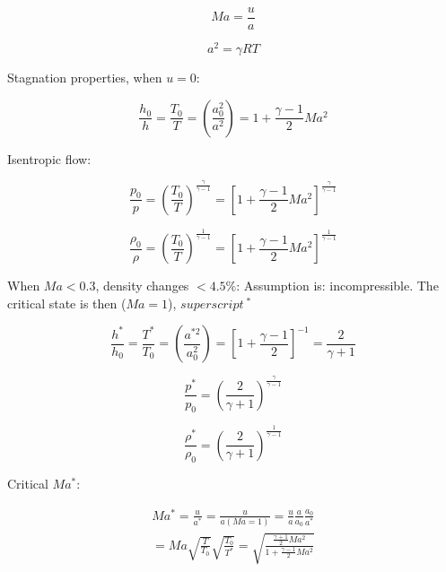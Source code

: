 \documentclass[8pt, landscape, fleqn]{scrartcl}
\begin{document}
\begin{multicols*}{3}
\begin{equation}
    Ma = \frac{u}{a}
\end{equation}

\begin{equation}
    a^2 = \gamma R T 
\end{equation}

Stagnation properties, when $u=0$: 

\begin{equation}
    \frac{h_0}{h} = \frac{T_0}{T} = \left( \frac{a_0^2}{a^2}\right) = 1 + \frac{\gamma - 1}{2} Ma^2
\end{equation}

Isentropic flow:

\begin{equation}
    \frac{p_0}{p} = \left( \frac{T_0}{T}\right)^{\frac{\gamma}{\gamma -1}} = \left[ 1 + \frac{\gamma-1}{2} Ma^2 \right]^{\frac{\gamma}{\gamma-1}}
\end{equation}

\begin{equation}
    \frac{\rho_0}{\rho} = \left( \frac{T_0}{T} \right)^{\frac{1}{\gamma-1}} = \left[ 1 + \frac{\gamma-1}{2} Ma^2 \right]^{\frac{1}{\gamma-1}}
\end{equation}

When $Ma < 0.3$, density changes $< 4.5 \%$: Assumption is: incompressible. The critical state is then ($Ma = 1$), $superscript~^*$

\begin{equation}
    \frac{h^*}{h_0} = \frac{T^*}{T_0} = \left( \frac{a^{*2}}{a_0^2}\right) = \left[ 1 + \frac{\gamma -1 }{2}\right]^{-1} = \frac{2}{\gamma+1}
\end{equation}

\begin{equation}
    \frac{p^*}{p_0} = \left( \frac{2}{\gamma+1} \right)^{\frac{\gamma}{\gamma-1}}
\end{equation}

\begin{equation}
    \frac{\rho^*}{\rho_0} = \left( \frac{2}{\gamma+1} \right)^{\frac{1}{\gamma-1}}
\end{equation}

Critical $Ma^*$:

\begin{align}
    Ma^* = \frac{u}{a^*} = \frac{u}{a(Ma=1)} = \frac{u}{a}\frac{a}{a_0}\frac{a_0}{a^*} \\
    = Ma \sqrt{\frac{T}{T_0}}\sqrt{\frac{T_0}{T^*}} = \sqrt{\frac{\frac{\gamma+1}{2}Ma^2}{1+\frac{\gamma-1}{2}Ma^2}}
\end{align}


\end{multicols*}
\end{document}
